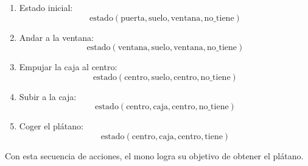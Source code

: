\begin{enumerate}
    \item Estado inicial:
    \begin{equation}
    \text{estado}(\text{puerta}, \text{suelo}, \text{ventana}, \text{no\_tiene})
    \end{equation}
    
    \item Andar a la ventana:
    \begin{equation}
    \text{estado}(\text{ventana}, \text{suelo}, \text{ventana}, \text{no\_tiene})
    \end{equation}
    
    \item Empujar la caja al centro:
    \begin{equation}
    \text{estado}(\text{centro}, \text{suelo}, \text{centro}, \text{no\_tiene})
    \end{equation}
    
    \item Subir a la caja:
    \begin{equation}
    \text{estado}(\text{centro}, \text{caja}, \text{centro}, \text{no\_tiene})
    \end{equation}
    
    \item Coger el plátano:
    \begin{equation}
    \text{estado}(\text{centro}, \text{caja}, \text{centro}, \text{tiene})
    \end{equation}
\end{enumerate}

Con esta secuencia de acciones, el mono logra su objetivo de obtener el plátano.
